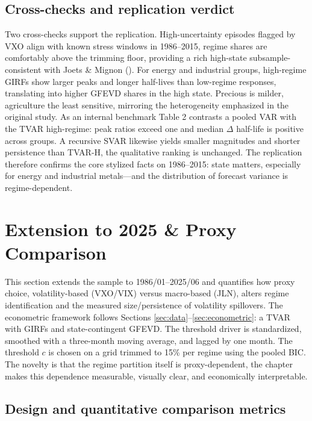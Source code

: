 \documentclass[
  11pt,
]{article}
\begin{document}
\subsection{Cross-checks and replication verdict}\label{sec:replicationfour}

Two cross-checks support the replication. High-uncertainty episodes flagged by VXO align with known stress windows in 1986--2015, regime shares are comfortably above the trimming floor, providing a rich high-state subsample-consistent with Joets \& Mignon (). For energy and industrial groups, high-regime GIRFs show larger peaks and longer half-lives than low-regime responses, translating into higher GFEVD shares in the high state. Precious is milder, agriculture the least sensitive, mirroring the heterogeneity emphasized in the original study.
As an internal benchmark Table 2 contrasts a pooled VAR with the TVAR high-regime: peak ratios exceed one and median \(\Delta\) half-life is positive across groups. A recursive SVAR likewise yields smaller magnitudes and shorter persistence than TVAR-H, the qualitative ranking is unchanged. The replication therefore confirms the core stylized facts on 1986--2015: state matters, especially for energy and industrial metals---and the distribution of forecast variance is regime-dependent.

\section{Extension to 2025 \& Proxy Comparison}\label{sec:extension}

This section extends the sample to 1986/01--2025/06 and quantifies how proxy choice, volatility-based (VXO/VIX) versus macro-based (JLN), alters regime identification and the measured size/persistence of volatility spillovers. The econometric framework follows Sections \ref{sec:data}--\ref{sec:econometric}: a TVAR with GIRFs and state-contingent GFEVD. The threshold driver is standardized, smoothed with a three-month moving average, and lagged by one month. The threshold \(c\) is chosen on a grid trimmed to 15\% per regime using the pooled BIC. The novelty is that the regime partition itself is proxy-dependent, the chapter makes this dependence measurable, visually clear, and economically interpretable.

\subsection{Design and quantitative comparison metrics}\label{sec:extensionone}
\end{document}
